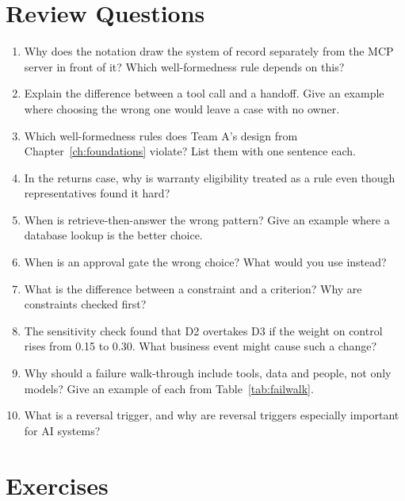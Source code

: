 \section*{Review Questions}

\begin{enumerate}[itemsep=2pt]
  \item Why does the notation draw the system of record separately from the MCP server in front of it? Which well-formedness rule depends on this?
  \item Explain the difference between a tool call and a handoff. Give an example where choosing the wrong one would leave a case with no owner.
  \item Which well-formedness rules does Team A's design from Chapter~\ref{ch:foundations} violate? List them with one sentence each.
  \item In the returns case, why is warranty eligibility treated as a rule even though representatives found it hard?
  \item When is retrieve-then-answer the wrong pattern? Give an example where a database lookup is the better choice.
  \item When is an approval gate the wrong choice? What would you use instead?
  \item What is the difference between a constraint and a criterion? Why are constraints checked first?
  \item The sensitivity check found that D2 overtakes D3 if the weight on control rises from 0.15 to 0.30. What business event might cause such a change?
  \item Why should a failure walk-through include tools, data and people, not only models? Give an example of each from Table~\ref{tab:failwalk}.
  \item What is a reversal trigger, and why are reversal triggers especially important for AI systems?
\end{enumerate}

\section*{Exercises}

